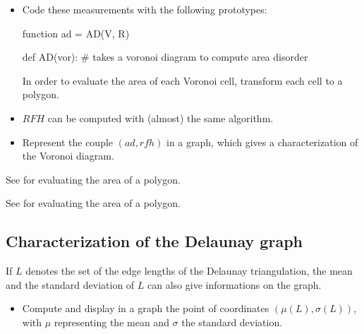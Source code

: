 \begin{qbox}
 \begin{itemize}
  \item Code these measurements with the following prototypes:
  \begin{matlab}
function ad = AD(V, R)
  \end{matlab}
  
  \begin{python}
def AD(vor):
# takes a voronoi diagram to compute area disorder
  \end{python}
  
  In order to evaluate the area of each Voronoi cell, transform each cell to a polygon. 

  \item $RFH$ can be computed with (almost) the same algorithm.
  
\item Represent the couple $(ad,rfh)$ in a graph, which gives a characterization of the Voronoi diagram.
 \end{itemize}
\end{qbox}

\begin{mcomment}
\begin{mremark}
See  for evaluating the area of a polygon.
\end{mremark}
\end{mcomment}

\begin{pcomment}
\begin{premark}
See  for evaluating the area of a polygon.
\end{premark}
\end{pcomment}


\subsection{Characterization of the Delaunay graph}
If $L$ denotes the set of the edge lengths of the Delaunay triangulation, the mean and the standard deviation of $L$ 
can also give informations on the graph.
\begin{qbox}
 \begin{itemize}
  \item Compute and display in a graph the point of coordinates $(\mu(L), \sigma(L))$, with $\mu$ representing the mean 
  and $\sigma$ the standard deviation.
 \end{itemize}

\end{qbox}

